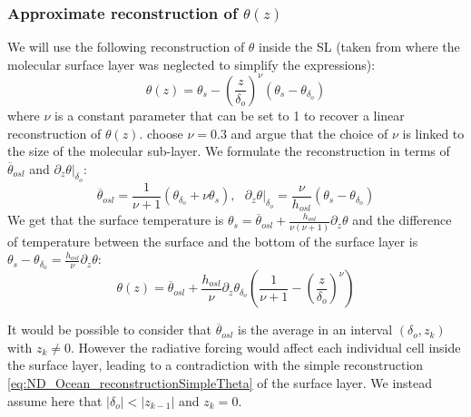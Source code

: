 \subsubsection*{Approximate reconstruction of $\theta(z)$}
We will use the following reconstruction of $\theta$
inside the SL (taken from \citep{zeng_prognostic_2005}
where the molecular surface layer was neglected to simplify
the expressions):
\begin{equation}
	\label{eq:ND_Ocean_reconstructionSimpleTheta}
    \theta(z) = \theta_s -
    \left(\frac{z}{\delta_{o}}\right)^\nu \left( \theta_s - 
    \theta_{\delta_o}\right)
\end{equation}
where $\nu$ is a constant parameter that can be set to 1 to
recover a linear reconstruction of $\theta(z)$.
\citep{zeng_prognostic_2005} choose $\nu=0.3$ and argue that
the choice of $\nu$ is linked to the size of the molecular
sub-layer.
We formulate the reconstruction in terms of $\overline{\theta}_{osl}$
and $\left.\partial_z \theta\right|_{\delta_o}$:
\begin{equation}
    \overline{\theta}_{osl} = \frac{1}{\nu+1}
    (\theta_{\delta_o} + \nu \theta_s)
	, ~~~ \left.\partial_z \theta \right|_{\delta_o}
= \frac{\nu}{h_{osl}} (\theta_s - \theta_{\delta_o})
\end{equation}
We get that the surface temperature
is $\theta_s = \overline{\theta}_{osl}
+ \frac{h_{osl}}{\nu(\nu+1)} \partial_z \theta$ and
the difference of temperature between
the surface and the bottom of the surface layer is
$\theta_s - \theta_{\delta_o} = 
\frac{h_{osl}}{\nu}\partial_z \theta$:
\begin{equation}
    \theta(z) = \overline{\theta}_{osl} +
    \frac{h_{osl}}{\nu} \partial_z \theta_{\delta_o} \left(
    \frac{1}{\nu+1} - \left(\frac{z}{\delta_{o}}\right)^\nu
\right)
\end{equation}
\begin{remark}
It would be possible to consider that $\overline{\theta}_{osl}$ is
the average in an interval $(\delta_o, z_k)$ with $z_k \neq 0$.
However the radiative forcing would affect each individual cell
inside the surface layer, leading to a contradiction with the simple
reconstruction \eqref{eq:ND_Ocean_reconstructionSimpleTheta}
of the surface layer.
We instead assume here that $|\delta_{o}| < |z_{k-1}|$ and $z_k=0$.
\end{remark}
